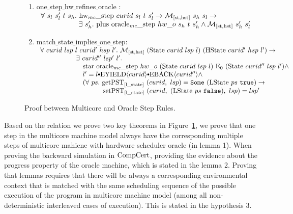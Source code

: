 \begin{figure}
\begin{enumerate}
\item one$\_$step$\_$hw$\_$refines$\_$oracle : \\
$
\begin{array}{l}
\forall \ s_l \ s_l' \ t \ s_h . \ {{{\mathrm{hw}_{mc}\_\mathrm{step}}}~{curid}~{s_l}~{t}~{s_l'}} \rightarrow  {{\mathcal{M}_{[\mathrm{st},\mathrm{hst}]}}~{s_h}~{s_l}} \rightarrow \\
\ \ \ \ \ \ \ \ \ \ \ \ \ \ \ \ \exists\ s_h' . \  {{\mathrm{plus}}~{{{{\mathrm{oracle}_{mc}\_\mathrm{step}}}~{hw\_o}~{s_h}~{t}~{s_h'}}}} \wedge  {{\mathcal{M}_{[\mathrm{st},\mathrm{hst}]}}~{s_h'}~{s_l'}}\\
\end{array}
$
\item match$\_$state$\_$implies$\_$one$\_$step: \\
$
\begin{array}{l}
\forall \ curid \ lsp \ l \ curid' \ hsp \ l' . \ \matchstatehstate{(\mcstate{curid}{lsp}{l})}{(\hstate{curid'}{hsp}{l'})} \rightarrow \\
\ \ \ \ \ \ \ \ \ \ \ \ \ \ \ \  \exists \ curid'' \ lsp' \ l'  . \ \\
\ \ \ \ \ \ \ \ \ \ \ \ \ \ \ \  \ \ \ \ccstarstep{\oraclestep{hw\_o}{(\mcstate{curid}{lsp}{l})}{\ccemptytrace}{(\mcstate{curid''}{lsp}{l'})}} \wedge\\
\ \ \ \ \ \ \ \ \ \ \ \ \ \ \ \  \ \ \ l' = \listconsoppo{\yieldbackev{curid''}}{\listconsoppo{\yieldev{curid}}{l}} \wedge\\
\ \ \ \ \ \ \ \ \ \ \ \ \ \ \ \  \ \ \ (\forall \ ps  . \ \getpstsome{\localstatekwd}{curid}{lsp}{(\localstate{ps}{\btrue})} \rightarrow \\
\ \ \ \ \ \ \ \ \ \ \ \ \ \ \ \  \ \ \ \ \ \ \ \ \ \  \ \ \setpst{\localstatekwd}{curid}{(\localstate{ps}{\bfalse})}{lsp}{lsp'} \\
\end{array}
$
\end{enumerate}

\caption{Proof between Multicore and Oracle Step Rules.}
\label{fig:chapter:conlink:refinement-multicore-oracle-steps}
\end{figure}

Based on the relation we prove two key theorems in Figure~\ref{fig:chapter:conlink:refinement-multicore-oracle-steps}, 
we prove that one step in the multicore machine model always have the corresponding 
multiple steps of multicore mahicne with hardware scheduler oracle (in lemma 1). 
When proving the backward simulation in $\mathrm{CompCert}$, providing the evidence about the progress property 
of the oracle machine, which is stated in the lemma 2. 
Proving that lemmas requires that there will be always a corresponding 
environmental context that is matched with the same scheduling sequence of 
the possible execution of the program in multicore machine model (among all non-deterministic interleaved 
cases of execution). 
This is stated in the hypothesis 3. 



